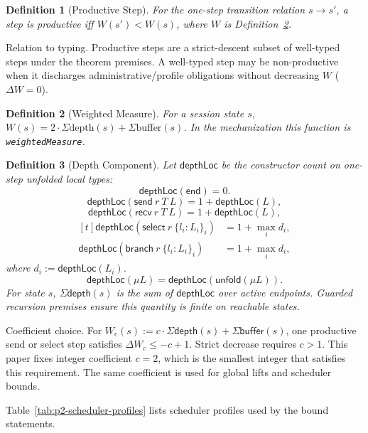 \documentclass[a4paper,10pt,twocolumn,english]{article}
\numberwithin{equation}{section}
\theoremstyle{paperdef}
\newtheorem{definition}{Definition}[section]
\theoremstyle{paperplain}
\theoremstyle{paperdef}
\theoremstyle{paperremark}
\begin{document}
\begin{definition}[Productive Step]
	For the one-step transition relation $s \to s'$, a step is productive iff $W(s') < W(s)$, where $W$ is Definition~\ref{def:p2-weighted-measure}.
\end{definition}

Relation to typing. Productive steps are a strict-descent subset of well-typed
steps under the theorem premises. A well-typed step may be non-productive when
it discharges administrative/profile obligations without decreasing $W$
($\Delta W=0$).

\begin{definition}[Weighted Measure]
	\label{def:p2-weighted-measure}
	For a session state $s$, $W(s) = 2 \cdot \Sigma\text{depth}(s) + \Sigma\text{buffer}(s)$. In the mechanization this function is \texttt{weightedMeasure}.
\end{definition}

\begin{definition}[Depth Component]
	Let $\mathsf{depthLoc}$ be the constructor count on one-step unfolded local types:
	\[
		\mathsf{depthLoc}(\mathsf{end}) = 0.
	\]
	\[
		\mathsf{depthLoc}(\mathsf{send}\ r\ T\ L) = 1 + \mathsf{depthLoc}(L),
	\]
	\[
		\mathsf{depthLoc}(\mathsf{recv}\ r\ T\ L) = 1 + \mathsf{depthLoc}(L),
	\]
	\[
		\begin{aligned}[t]
			\mathsf{depthLoc}(\mathsf{select}\ r\ \{l_i:L_i\}_i) & = 1 + \max_i d_i, \\
			\mathsf{depthLoc}(\mathsf{branch}\ r\ \{l_i:L_i\}_i) & = 1 + \max_i d_i,
		\end{aligned}
	\]
	where $d_i := \mathsf{depthLoc}(L_i)$.
	\[
		\mathsf{depthLoc}(\mu L) = \mathsf{depthLoc}(\mathsf{unfold}(\mu L)).
	\]
	For state $s$, $\Sigma\mathsf{depth}(s)$ is the sum of $\mathsf{depthLoc}$ over active endpoints.
	Guarded recursion premises ensure this quantity is finite on reachable states.
\end{definition}

Coefficient choice. For $W_c(s):=c\cdot\Sigma\mathsf{depth}(s)+\Sigma\mathsf{buffer}(s)$, one productive send or select step satisfies $\Delta W_c \le -c + 1$. Strict decrease requires $c>1$. This paper fixes integer coefficient $c=2$, which is the smallest integer that satisfies this requirement. The same coefficient is used for global lifts and scheduler bounds.

Table~\ref{tab:p2-scheduler-profiles} lists scheduler profiles used by the bound statements.
\end{document}
